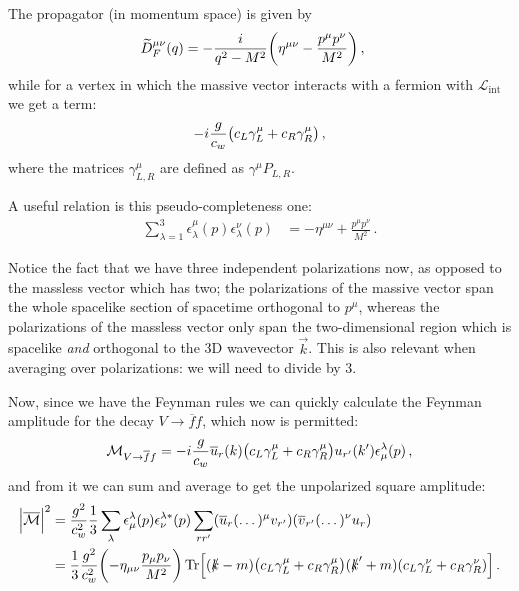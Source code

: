 \documentclass[main.tex]{subfiles}
\begin{document}
The propagator (in momentum space) is given by 
%
\begin{align}
\widetilde{D}^{\mu \nu }_F (q) &=- 
\frac{i}{q^2 - M^2} 
\qty(
    \eta^{\mu \nu } 
    - \frac{p^{\mu }p^{\nu }}{M^2}
)
\,,
\end{align}
%
while for a vertex in which the massive vector interacts with a fermion with \(\mathscr{L} _{\text{int}}\) we get a term: 
%
\begin{align}
-i \frac{g}{c_w} \qty(c_L \gamma^{\mu }_{L} + c_R \gamma^{\mu }_{R})
\,,
\end{align}
%
where the matrices \(\gamma^{\mu }_{L, R}\) are defined as \(\gamma^{\mu} P_{L, R}\). 

A useful relation is this pseudo-completeness one:
%
\begin{align}
\sum _{\lambda = 1}^{3} \epsilon^{\mu }_{\lambda }(p) \epsilon^{\nu }_{\lambda } (p) &= - \eta^{\mu \nu } + \frac{p^{\mu } p^{\nu }}{M^2}
\,.
\end{align}

Notice the fact that we have three independent polarizations now, as opposed to the massless vector which has two; the polarizations of the massive vector span the whole spacelike section of spacetime orthogonal to \(p^{\mu }\), whereas the polarizations of the massless vector only span the two-dimensional region which is spacelike \emph{and} orthogonal to the 3D wavevector \(\vec{k}\). 
This is also relevant when averaging over polarizations: we will need to divide by \(3\). 

Now, since we have the Feynman rules we can quickly calculate the Feynman amplitude for the decay \(V \to \overline{f} f\), which now is permitted: 
%
\begin{align}
\mathcal{M}_{V \to \overline{f}f}
= -i \frac{g}{c_w} \overline{u}_{r} (k)  
\qty(c_L \gamma^{\mu }_{L} + c_R \gamma^{\mu }_{R})
u_{r'} (k') \epsilon_{\mu }^{\lambda} (p)
\,,
\end{align}
%
and from it we can sum and average to get the unpolarized square amplitude: 
%
\begin{align}
\abs{\mathcal{\overline{M}}}^2 &=
\frac{g^2}{c_w^2} \frac{1}{3} 
\sum _{\lambda } \epsilon_{\mu }^{\lambda }(p) \epsilon_{\nu }^{\lambda *}(p) 
\sum _{r r'} (\overline{u}_r (\dots)^{\mu } v_{r'}  )
( \overline{v}_{r'} (\dots)^{\nu } u_r )  \\
&= \frac{1}{3} \frac{g^2}{c_w^2} 
\qty(- \eta_{\mu\nu } \frac{p_{\mu }p_{\nu}}{M^2})
\Tr[(\slashed{k} - m)\qty(c_L \gamma^{\mu }_{L} + c_R \gamma^{\mu }_{R})
 (\slashed{k}' + m)\qty(c_L \gamma^{\nu }_{L} + c_R \gamma^{\nu }_{R})]
\,.
\end{align}
\end{document}
